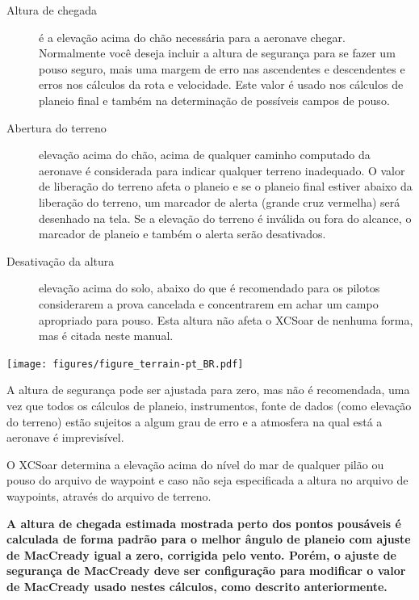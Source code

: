 \begin{description}
\item[Altura de chegada] é a elevação acima do chão necessária para a aeronave chegar.  Normalmente você deseja incluir a altura de segurança para se fazer um pouso seguro, mais uma margem de erro nas ascendentes e descendentes e erros nos cálculos da rota e velocidade.  Este valor é usado nos cálculos de planeio final e também na determinação de possíveis campos de pouso.  
\item[Abertura do terreno] elevação acima do chão, acima de qualquer caminho computado da aeronave é considerada para indicar qualquer terreno inadequado.  O valor de liberação do terreno afeta o planeio e se o planeio final estiver abaixo da liberação do terreno, um marcador de alerta (grande cruz vermelha) será desenhado na tela.  Se a elevação do terreno é inválida ou fora do alcance, o marcador de planeio e também o alerta serão desativados.
\item[Desativação da altura] elevação acima do solo, abaixo do que é recomendado para os pilotos considerarem a prova cancelada e concentrarem em achar um campo apropriado para pouso.  Esta altura não afeta o XCSoar de nenhuma forma, mas é citada neste manual.
\end{description}

\begin{maxipage}
\begin{center}
\texttt{[image: figures/figure\_terrain-pt\_BR.pdf]}
\end{center}
\end{maxipage}

\warning
A altura de segurança pode ser ajustada para zero, mas não é recomendada, uma vez que todos os cálculos de planeio, instrumentos, fonte de dados (como elevação do terreno) estão sujeitos a algum grau de erro e a atmosfera na qual está a aeronave é imprevisível.

 O XCSoar determina a elevação acima do nível do mar de qualquer pilão ou pouso do arquivo de waypoint e caso não seja especificada a altura no arquivo de waypoints, através do arquivo de terreno.

\textbf{A altura de chegada estimada mostrada perto dos pontos pousáveis é calculada de forma padrão para o melhor ângulo de planeio com ajuste de MacCready igual a zero, corrigida pelo vento.  Porém, o ajuste de segurança de MacCready deve ser configuração para modificar o valor de MacCready usado nestes cálculos, como descrito anteriormente.}

